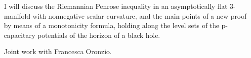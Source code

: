 \mypage
{}
\begin{myabstract}
I will discuss the Riemannian Penrose inequality in an asymptotically flat 3-manifold with nonnegative scalar curvature, and the main points of a new proof by means of a monotonicity formula, holding along the level sets of the p-capacitary potentials of the horizon of a black hole.

Joint work with Francesca Oronzio.
\end{myabstract}

